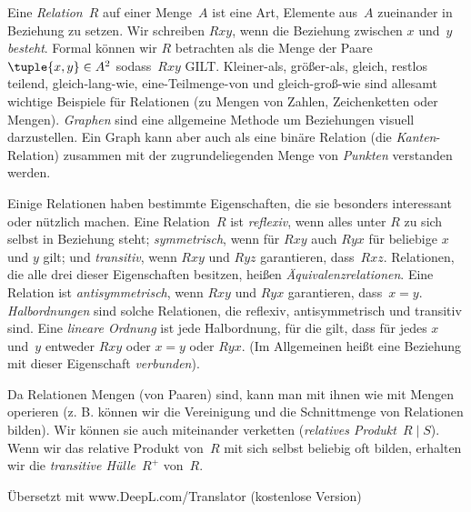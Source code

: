 Eine \emph{Relation}~$R$ auf einer Menge~$A$ ist eine Art, Elemente
aus~$A$ zueinander in Beziehung zu setzen. Wir schreiben $Rxy$, wenn die Beziehung zwischen $x$
und~$y$ \emph{besteht}. Formal können wir $R$ betrachten als die Menge der Paare
$\tuple{x,y} \in A^2$ sodass~$Rxy$ GILT. Kleiner-als, größer-als,
gleich, restlos teilend, gleich-lang-wie, eine-Teilmenge-von und gleich-groß-wie
sind allesamt wichtige Beispiele für Relationen (zu
Mengen von Zahlen, Zeichenketten oder Mengen). \emph{Graphen} sind eine allgemeine Methode
um Beziehungen visuell darzustellen. Ein Graph kann aber auch als eine
binäre Relation (die \emph{Kanten}-Relation) zusammen mit der
zugrundeliegenden Menge von \emph{Punkten} verstanden werden.

Einige Relationen haben bestimmte Eigenschaften, die sie besonders
interessant oder nützlich machen. Eine Relation~$R$ ist \emph{reflexiv}, wenn
alles unter $R$ zu sich selbst in Beziehung steht; \emph{symmetrisch}, wenn für  $Rxy$
auch $Ryx$ für beliebige $x$ und $y$ gilt; und \emph{transitiv}, wenn $Rxy$
und $Ryz$ garantieren, dass~$Rxz$. Relationen, die alle drei dieser
Eigenschaften besitzen, heißen \emph{Äquivalenzrelationen}. Eine Relation ist
\emph{antisymmetrisch}, wenn $Rxy$ und $Ryx$
garantieren, dass~$x=y$. \emph{Halbordnungen} sind solche Relationen, die
reflexiv, antisymmetrisch und transitiv sind. Eine \emph{lineare Ordnung} ist
jede Halbordnung, für die gilt, dass für jedes $x$ und~$y$ entweder
$Rxy$ oder $x=y$ oder $Ryx$. (Im Allgemeinen heißt eine Beziehung mit dieser Eigenschaft
\emph{verbunden}).

Da Relationen Mengen (von Paaren) sind, kann man mit ihnen wie mit Mengen operieren
(z. B. können wir die Vereinigung und die Schnittmenge von Relationen bilden). Wir können
sie auch miteinander verketten (\emph{relatives Produkt}~$R \mid S$). Wenn wir
das relative Produkt von~$R$ mit sich selbst beliebig oft bilden, erhalten wir die \emph{transitive Hülle}~$R^+$ von~$R$.


Übersetzt mit www.DeepL.com/Translator (kostenlose Version)